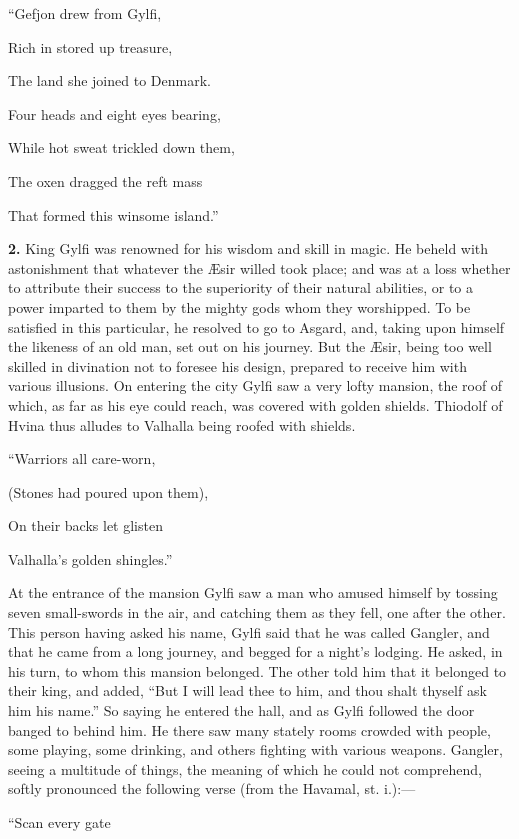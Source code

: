 ``Gefjon drew from Gylfi,

Rich in stored up treasure,

The land she joined to Denmark.

Four heads and eight eyes bearing,

While hot sweat trickled down them,

The oxen dragged the reft mass

That formed this winsome island.''


\textbf{2.} King Gylfi was renowned for his wisdom and skill in magic. He
beheld with astonishment that whatever the Æsir willed took place; and
was at a loss whether to attribute their success to the superiority of
their natural abilities, or to a power imparted to them by the mighty
gods whom they worshipped. To be satisfied in this particular, he
resolved to go to Asgard, and, taking upon himself the likeness of an
old man, set out on his journey. But the Æsir, being too well skilled
in divination not to foresee his design, prepared to receive him with
various illusions. On entering the city Gylfi saw a very lofty
mansion, the roof of which, as far as his eye could reach, was covered
with golden shields. Thiodolf of Hvina thus alludes to Valhalla being
roofed with shields.

``Warriors all care-worn,

(Stones had poured upon them),

On their backs let glisten

Valhalla's golden shingles.''

At the entrance of the mansion Gylfi saw a man who amused himself by
tossing seven small-swords in the air, and catching them as they fell,
one after the other. This person having asked his name, Gylfi said
that he was called Gangler, and that he came from a long journey, and
begged for a night's lodging. He asked, in his turn, to whom this
mansion belonged. The other told him that it belonged to their king,
and added, ``But I will lead thee to him, and thou shalt thyself ask
him his name.'' So saying he entered the hall, and as Gylfi followed
the door banged to behind him. He there saw many stately rooms crowded
with people, some playing, some drinking, and others fighting with
various weapons. Gangler, seeing a multitude of things, the meaning of
which he could not comprehend, softly pronounced the following verse
(from the Havamal, st. i.):—

``Scan every gate

